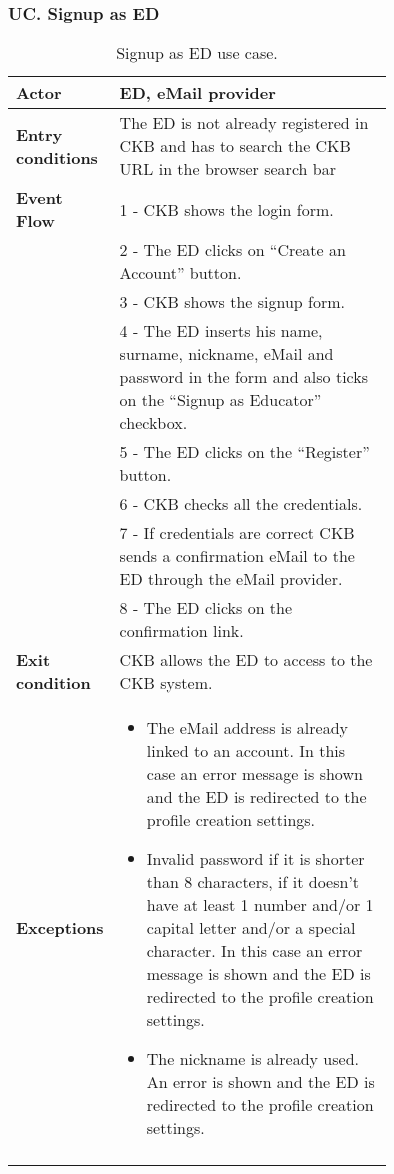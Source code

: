 \subsubsection*{UC\cuc . Signup as ED}
\begin{center}
    \begin{longtable}{|l|p{0.75\linewidth}|}
        \hline
        \textbf{Actor}            & ED, eMail provider\\
        \hline
        \textbf{Entry conditions} & The ED is not already registered in CKB and has to search the CKB URL in the browser search bar \\
        \hline
        \textbf{Event Flow}       & 1 - CKB shows the login form.  \\
        & 2 - The ED clicks on “Create an Account” button.   \\
        & 3 - CKB shows the signup form.    \\
        & 4 - The ED inserts his name, surname, nickname, eMail and password in the form and also ticks on the “Signup as Educator” checkbox.  \\
        & 5 - The ED clicks on the “Register” button.  \\
        & 6 - CKB checks all the credentials.  \\
        & 7 - If credentials are correct CKB sends a confirmation eMail to the ED through the eMail provider.  \\
        & 8 - The ED clicks on the confirmation link.    \\
        \hline
        \textbf{Exit condition}   & CKB allows the ED to access to the CKB system. \\       
        \hline
        \textbf{Exceptions}       & \begin{itemize}
            \item The eMail address is already linked to an account. In this case an error message is shown and the ED is redirected to the profile creation settings.
            \item Invalid password if it is shorter than 8 characters, if it doesn’t have at least 1 number and/or 1 capital letter and/or a special character. In this case an error message is shown and the ED is redirected to the profile creation settings.
            \item  The nickname is already used. An error is shown and the ED is redirected to the profile creation settings.
        \end{itemize}\\
        \hline
        \caption{Signup as ED use case.}
        \label{tab:signup_as_ED_use_case}
    \end{longtable}
\end{center}

